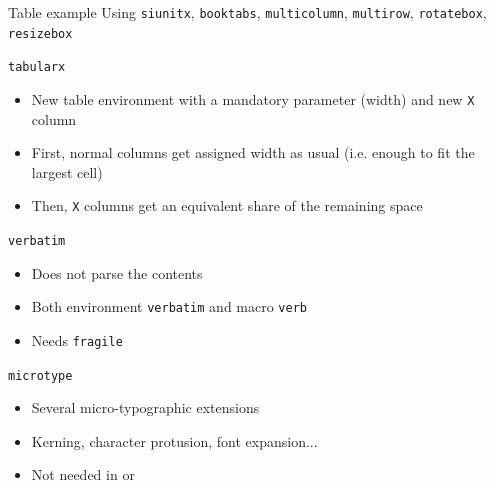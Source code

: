 \documentclass[english]{beamer}
\let\olditem\item
\renewcommand{\item}{\setlength{\itemsep}{\fill}\olditem}
\let\textttt\texttt
\renewcommand{\texttt}[1]{\colorbox{gray!10}{\textttt{#1}}}
\begin{document}
\begin{frame}[label=sld_table]{Table example }
{\tiny Using \texttt{siunitx}, \texttt{booktabs}, \texttt{multicolumn}, \texttt{multirow}, \texttt{rotatebox}, \texttt{resizebox}}

\end{frame}

\begin{frame}{\texttt{tabularx}}
    \begin{itemize}
        \item New table environment with a mandatory parameter (width) and new \texttt{X} column
        \item First, normal columns get assigned width as usual (i.e. enough to fit the largest cell)
        \item Then, \texttt{X} columns get an equivalent share of the remaining space
    \end{itemize}
\end{frame}

\begin{frame}{\texttt{verbatim}}
    \begin{itemize}
        \item Does not parse the contents
        \item Both environment \texttt{verbatim} and macro \texttt{verb}
        \item Needs \texttt{fragile}
    \end{itemize}
\end{frame}

\begin{frame}{\texttt{microtype}}
    \begin{itemize}
        \item Several micro-typographic extensions
        \item Kerning, character protusion, font expansion...
        \item Not needed in   or 
    \end{itemize}
\end{frame}
\end{document}
